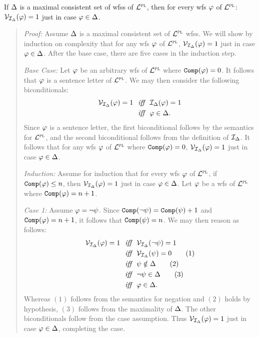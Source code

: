 \begin{Lthm} \label{lemma:PL-truth}
  If $\Delta$ is a maximal consistent set of wfss of $\mathcal{L}^{\textsc{pl}}$, then for every wfs $\varphi$ of $\mathcal{L}^{\textsc{pl}}$: $\mathcal{V}_{\mathcal{I}_{\Delta}}(\varphi) = 1$ just in case $\varphi\in\Delta$.  
\end{Lthm} \vspace{-.2in}

\begin{quote} 
  \textit{Proof:} 
  Assume $\Delta$ is a maximal consistent set of $\mathcal{L}^{\textsc{pl}}$ wfss.
  We will show by induction on complexity that for any wfs $\varphi$ of $\mathcal{L}^{\textsc{pl}}$, $\mathcal{V}_{\mathcal{I}_{\Delta}}(\varphi) = 1$ just in case $\varphi\in\Delta$.
  After the base case, there are five cases in the induction step.

  \textit{Base Case:} 
  Let $\varphi$ be an arbitrary wfs of $\mathcal{L}^{\textsc{pl}}$ where $\texttt{Comp}(\varphi)=0$.
  It follows that $\varphi$ is a sentence letter of $\mathcal{L}^{\textsc{pl}}$.
  We may then consider the following biconditionals:
  \begin{align*}
    \mathcal{V}_{\mathcal{I}_{\Delta}}(\varphi)=1 
      &\textit{ ~iff~ } \mathcal{I}_{\Delta}(\varphi) = 1\\
      &\textit{ ~iff~ } \varphi \in \Delta.
  \end{align*}
  Since $\varphi$ is a sentence letter, the first biconditional follows by the semantics for $\mathcal{L}^{\textsc{pl}}$, and the second biconditional follows from the definition of $\mathcal{I}_{\Delta}$.
  It follows that for any wfs $\varphi$ of $\mathcal{L}^{\textsc{pl}}$ where $\texttt{Comp}(\varphi) = 0$, $\mathcal{V}_{\mathcal{I}_{\Delta}}(\varphi) = 1$ just in case $\varphi\in\Delta$.

  \textit{Induction:}
  Assume for induction that for every wfs $\varphi$ of $\mathcal{L}^{\textsc{pl}}$, if $\texttt{Comp}(\varphi)\leq n$, then $\mathcal{V}_{\mathcal{I}_{\Delta}}(\varphi) = 1$ just in case $\varphi\in\Delta$. 
  Let $\varphi$ be a wfs of $\mathcal{L}^{\textsc{pl}}$ where $\texttt{Comp}(\varphi)=n+1$.

  \textit{Case 1:}
  Assume $\varphi=\neg \psi$.
  Since $\texttt{Comp}(\neg \psi)=\texttt{Comp}(\psi)+1$ and $\texttt{Comp}(\varphi)=n+1$, it follows that $\texttt{Comp}(\psi)=n$.
  We may then reason as follows:
  \begin{align*}
    \mathcal{V}_{\mathcal{I}_{\Delta}}(\varphi) = 1 &\textit{ ~iff~ } \mathcal{V}_{\mathcal{I}_{\Delta}}(\neg \psi) = 1\\
      &\textit{ ~iff~ } \mathcal{V}_{\mathcal{I}_{\Delta}}(\psi) = 0   \tag{1} \\
      &\textit{ ~iff~ } \psi \notin \Delta        \tag{2} \\
      &\textit{ ~iff~ } \neg \psi \in \Delta     \tag{3} \\
      &\textit{ ~iff~ } \varphi \in \Delta.
  \end{align*}
  Whereas $(1)$ follows from the semantics for negation and $(2)$ holds by hypothesis, $(3)$ follows from the maximality of $\Delta$. %
  The other biconditionals follow from the case assumption.
  Thus $\mathcal{V}_{\mathcal{I}_{\Delta}}(\varphi) = 1$ just in case $\varphi\in\Delta$, completing the case.


\end{quote}
